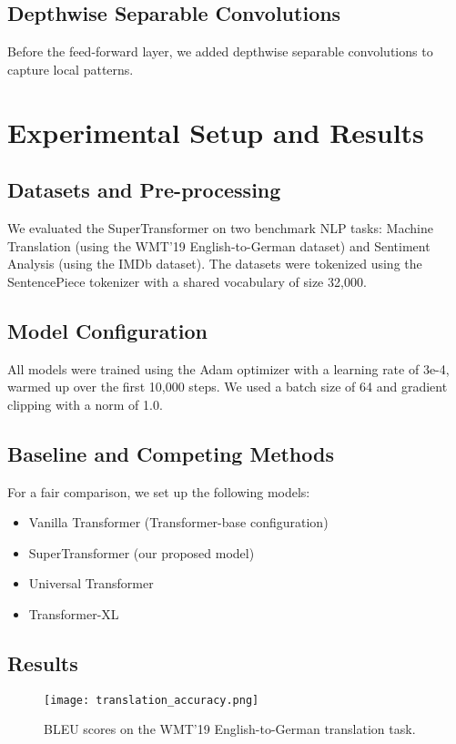 \documentclass{article}
\begin{document}
\subsection{Depthwise Separable Convolutions}
Before the feed-forward layer, we added depthwise separable convolutions to capture local patterns.

\section{Experimental Setup and Results}

\subsection{Datasets and Pre-processing}
We evaluated the SuperTransformer on two benchmark NLP tasks: Machine Translation (using the WMT'19 English-to-German dataset) and Sentiment Analysis (using the IMDb dataset). The datasets were tokenized using the SentencePiece tokenizer with a shared vocabulary of size 32,000.

\subsection{Model Configuration}
All models were trained using the Adam optimizer with a learning rate of 3e-4, warmed up over the first 10,000 steps. We used a batch size of 64 and gradient clipping with a norm of 1.0.

\subsection{Baseline and Competing Methods}
For a fair comparison, we set up the following models:
\begin{itemize}
    \item Vanilla Transformer (Transformer-base configuration)
    \item SuperTransformer (our proposed model)
    \item Universal Transformer
    \item Transformer-XL
\end{itemize}

\subsection{Results}

\begin{figure}[h]
    \centering
    \texttt{[image: translation\_accuracy.png]}
    \caption{BLEU scores on the WMT'19 English-to-German translation task.}
    \label{fig:translation_accuracy}
\end{figure}
\end{document}
